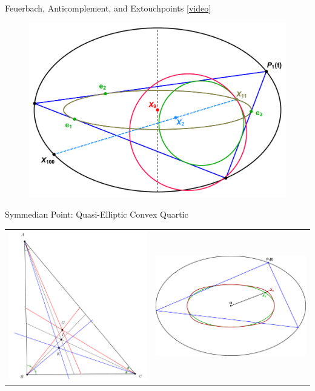 \begin{frame}{Feuerbach, Anticomplement, and Extouchpoints \href{https://youtu.be/TXdg7tUl8lc}{[video]}}
\begin{figure}
\includegraphics[height=.75\textheight]{pics/0035_feuerbach_loci.pdf}
\end{figure}
\end{frame}

\begin{frame}{Symmedian Point: Quasi-Elliptic Convex Quartic}
\begin{tabular}{rl}    \includegraphics[width=.4\textwidth]{pics/0000_symmedian.png} & \hspace{-1cm} \includegraphics[width=.6\textwidth]{pics/0041_symmedian.pdf}
\end{tabular}
\end{frame}

